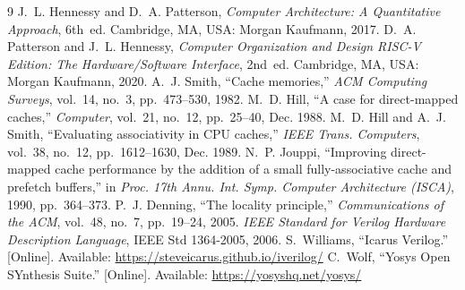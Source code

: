 \documentclass[conference]{IEEEtran}
\begin{document}
\begin{thebibliography}{9}
 J.~L. Hennessy and D.~A. Patterson, \emph{Computer Architecture: A Quantitative Approach},
6th~ed. Cambridge, MA, USA: Morgan Kaufmann, 2017.
 D.~A. Patterson and J.~L. Hennessy, \emph{Computer Organization and Design RISC-V Edition:
The Hardware/Software Interface}, 2nd~ed. Cambridge, MA, USA: Morgan Kaufmann, 2020.
 A.~J. Smith, ``Cache memories,'' \emph{ACM Computing Surveys}, vol.~14, no.~3, pp.~473--530,
1982.
 M.~D. Hill, ``A case for direct-mapped caches,'' \emph{Computer}, vol.~21, no.~12, pp.~25--40,
Dec. 1988.
 M.~D. Hill and A.~J. Smith, ``Evaluating associativity in CPU caches,'' \emph{IEEE Trans.
Computers}, vol.~38, no.~12, pp.~1612--1630, Dec. 1989.
 N.~P. Jouppi, ``Improving direct-mapped cache performance by the addition of a small
fully-associative cache and prefetch buffers,'' in \emph{Proc. 17th Annu. Int. Symp. Computer Architecture (ISCA)},
1990, pp.~364--373.
 P.~J. Denning, ``The locality principle,'' \emph{Communications of the ACM}, vol.~48, no.~7,
pp.~19--24, 2005.
 \emph{IEEE Standard for Verilog Hardware Description Language}, IEEE Std 1364-2005, 2006.
 S.~Williams, ``Icarus Verilog.'' [Online]. Available: \url{https://steveicarus.github.io/iverilog/}
 C.~Wolf, ``Yosys Open SYnthesis Suite.'' [Online]. Available: \url{https://yosyshq.net/yosys/}
\end{thebibliography}
\end{document}
